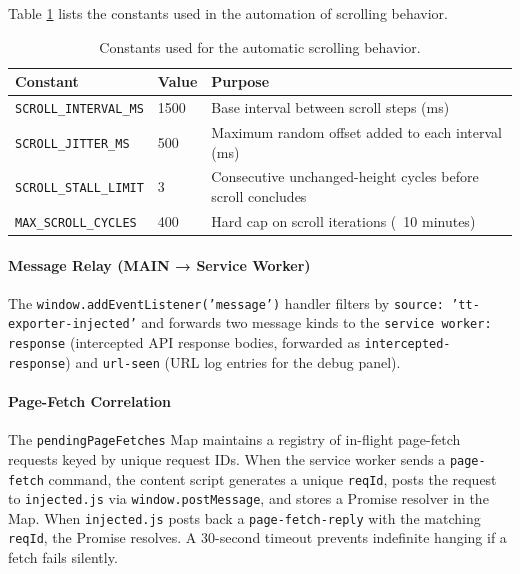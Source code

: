 Table \ref{tab:scroll_behavior_constants} lists the constants used in the automation of scrolling behavior.

\begin{table}[h]
    \centering
    \begin{tabular}{lll}
        \toprule
        Constant & Value & Purpose \\
        \midrule
         \texttt{SCROLL\_INTERVAL\_MS} & 1500 & Base interval between scroll steps (ms) \\
         \texttt{SCROLL\_JITTER\_MS} & 500 & Maximum random offset added to each interval (ms) \\
         \texttt{SCROLL\_STALL\_LIMIT} & 3 & Consecutive unchanged-height cycles before scroll concludes \\
         \texttt{MAX\_SCROLL\_CYCLES} & 400 & Hard cap on scroll iterations (~10 minutes) \\
        \bottomrule
    \end{tabular}
    \caption{Constants used for the automatic scrolling behavior.}
    \label{tab:scroll_behavior_constants}
\end{table}

\paragraph{\textbf{Message Relay (MAIN → Service Worker)}}

The \texttt{window.addEventListener('message')} handler filters by \texttt{source: 'tt-exporter-injected'} and forwards two message kinds to the \texttt{service worker: response} (intercepted API response bodies, forwarded as \texttt{intercepted-response}) and \texttt{url-seen} (URL log entries for the debug panel).

\paragraph{\textbf{Page-Fetch Correlation}}

The \texttt{pendingPageFetches} Map maintains a registry of in-flight page-fetch requests keyed by unique request IDs. When the service worker sends a \texttt{page-fetch} command, the content script generates a unique \texttt{reqId}, posts the request to \texttt{injected.js} via \texttt{window.postMessage}, and stores a Promise resolver in the Map. When \texttt{injected.js} posts back a \texttt{page-fetch-reply} with the matching \texttt{reqId}, the Promise resolves. A 30-second timeout prevents indefinite hanging if a fetch fails silently.

